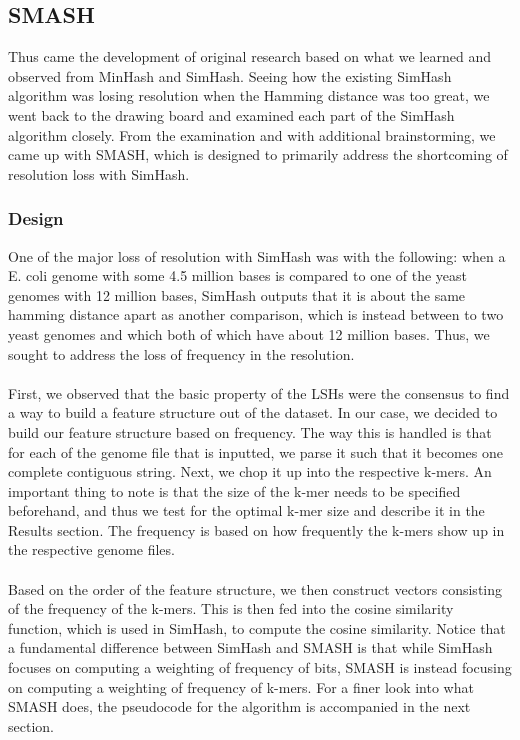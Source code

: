 \documentclass[12pt, letterpaper]{article}
\begin{document}
\subsection{SMASH}
Thus came the development of original research based on what we learned and observed from MinHash and SimHash. Seeing how the existing SimHash algorithm was losing resolution when the Hamming distance was too great, we went back to the drawing board and examined each part of the SimHash algorithm closely. From the examination and with additional brainstorming, we came up with SMASH, which is designed to primarily address the shortcoming of resolution loss with SimHash.

\subsubsection{Design}
One of the major loss of resolution with SimHash was with the following: when a E. coli genome with some 4.5 million bases is compared to one of the yeast genomes with 12 million bases, SimHash outputs that it is about the same hamming distance apart as another comparison, which is instead between to two yeast genomes and which both of which have about 12 million bases. Thus, we sought to address the loss of frequency in the resolution.  \\ \\
First, we observed that the basic property of the LSHs were the consensus to find a way to build a feature structure out of the dataset. In our case, we decided to build our feature structure based on frequency. The way this is handled is that for each of the genome file that is inputted, we parse it such that it becomes one complete contiguous string. Next, we chop it up into the respective k-mers. An important thing to note is that the size of the k-mer needs to be specified beforehand, and thus we test for the optimal k-mer size and describe it in the Results section. The frequency is based on how frequently the k-mers show up in the respective genome files. \\ \\
Based on the order of the feature structure, we then construct vectors consisting of the frequency of the k-mers. This is then fed into the cosine similarity function, which is used in SimHash, to compute the cosine similarity. Notice that a fundamental difference between SimHash and SMASH is that while SimHash focuses on computing a weighting of frequency of bits, SMASH is instead focusing on computing a weighting of frequency of k-mers. For a finer look into what SMASH does, the pseudocode for the algorithm is accompanied in the next section.
\end{document}
